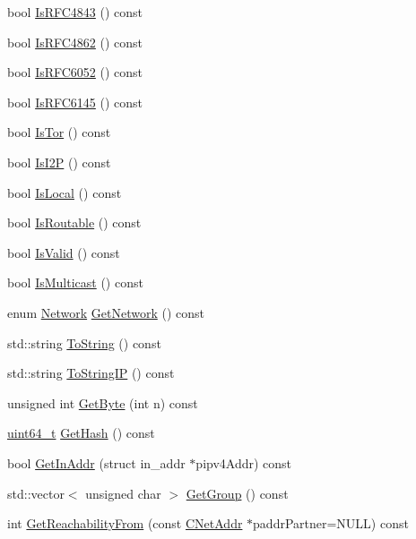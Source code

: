 \begin{DoxyCompactItemize}
bool \hyperlink{class_c_net_addr_ad69e51fffff5ee9fcabedda51f10a3ce}{Is\+R\+F\+C4843} () const 
\item 
bool \hyperlink{class_c_net_addr_a5cba67eb628ea99ea68addfe14913fa3}{Is\+R\+F\+C4862} () const 
\item 
bool \hyperlink{class_c_net_addr_a8057dbecf9f5b4d33a643990b6eec873}{Is\+R\+F\+C6052} () const 
\item 
bool \hyperlink{class_c_net_addr_ab5d91a88d77777004c8ebd658c8caf54}{Is\+R\+F\+C6145} () const 
\item 
bool \hyperlink{class_c_net_addr_a3fba9e0b18f531c0ed15794a30e8165d}{Is\+Tor} () const 
\item 
bool \hyperlink{class_c_net_addr_a4502c75bf0bf1b5d07738587627288b4}{Is\+I2\+P} () const 
\item 
bool \hyperlink{class_c_net_addr_a6cfa18f323424408cf7ace36c9a7c2e2}{Is\+Local} () const 
\item 
bool \hyperlink{class_c_net_addr_a35131b2792434d1c9a860c583b610ab6}{Is\+Routable} () const 
\item 
bool \hyperlink{class_c_net_addr_a52a1b506f07e5450057e12a8b5a7fbcd}{Is\+Valid} () const 
\item 
bool \hyperlink{class_c_net_addr_ab6593d2d75ca7cc6f00c2831cc0a8b73}{Is\+Multicast} () const 
\item 
enum \hyperlink{netbase_8h_acc9a38c714afe79b5035cb36f560dac3}{Network} \hyperlink{class_c_net_addr_a34a4760424f5c51998fc3baf82ccb5c8}{Get\+Network} () const 
\item 
std\+::string \hyperlink{class_c_net_addr_aae906cecdba331389f249a64693895b6}{To\+String} () const 
\item 
std\+::string \hyperlink{class_c_net_addr_a7ec845c27b63853fb0db08a4d154266f}{To\+String\+I\+P} () const 
\item 
unsigned int \hyperlink{class_c_net_addr_a0793d30a6baae6e3d4e06084ec33eddd}{Get\+Byte} (int n) const 
\item 
\hyperlink{stdint_8h_aaa5d1cd013383c889537491c3cfd9aad}{uint64\+\_\+t} \hyperlink{class_c_net_addr_a4c94fea8695ef97adf5b2a18e1074308}{Get\+Hash} () const 
\item 
bool \hyperlink{class_c_net_addr_aa2e2c78db01a6a27d6a2740f2ba43e90}{Get\+In\+Addr} (struct in\+\_\+addr $\ast$pipv4\+Addr) const 
\item 
std\+::vector$<$ unsigned char $>$ \hyperlink{class_c_net_addr_af196f306433562cb088dc83fd314a267}{Get\+Group} () const 
\item 
int \hyperlink{class_c_net_addr_a3007deff5e9872d620952362ae0ef144}{Get\+Reachability\+From} (const \hyperlink{class_c_net_addr}{C\+Net\+Addr} $\ast$paddr\+Partner=N\+U\+L\+L) const 

\end{DoxyCompactItemize}
